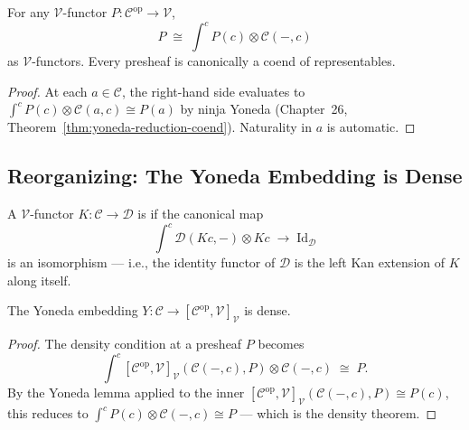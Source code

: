 \begin{theorem}
\label{thm:density-formal}
For any $\mathcal{V}$-functor $P : \mathcal{C}^{\mathrm{op}} \to \mathcal{V}$,
\begin{equation*}
  P \;\cong\; \int^c P(c) \otimes \mathcal{C}(-, c)
\end{equation*}
as $\mathcal{V}$-functors. Every presheaf is canonically a coend of
representables.
\end{theorem}

\begin{proof}
At each $a \in \mathcal{C}$, the right-hand side evaluates to
$\int^c P(c) \otimes \mathcal{C}(a, c) \cong P(a)$ by ninja Yoneda
(Chapter~26, Theorem~\ref{thm:yoneda-reduction-coend}). Naturality in $a$ is
automatic.
\end{proof}

\subsection{Reorganizing: The Yoneda Embedding is Dense}

\begin{definition}
\label{def:dense}
A $\mathcal{V}$-functor $K : \mathcal{C} \to \mathcal{D}$ is  if
the canonical map
\begin{equation*}
  \int^c \mathcal{D}(K c, -) \otimes K c \;\longrightarrow\; \mathrm{Id}_\mathcal{D}
\end{equation*}
is an isomorphism — i.e., the identity functor of $\mathcal{D}$ is the left
Kan extension of $K$ along itself.
\end{definition}

\begin{corollary}
\label{cor:yoneda-dense}
The Yoneda embedding $Y : \mathcal{C} \to [\mathcal{C}^{\mathrm{op}},
\mathcal{V}]_\mathcal{V}$ is dense.
\end{corollary}

\begin{proof}
The density condition at a presheaf $P$ becomes
\begin{equation*}
  \int^c [\mathcal{C}^{\mathrm{op}}, \mathcal{V}]_\mathcal{V}(\mathcal{C}(-, c), P)
  \otimes \mathcal{C}(-, c) \;\cong\; P.
\end{equation*}
By the Yoneda lemma applied to the inner $[\mathcal{C}^{\mathrm{op}},
\mathcal{V}]_\mathcal{V}(\mathcal{C}(-, c), P) \cong P(c)$, this reduces to
$\int^c P(c) \otimes \mathcal{C}(-, c) \cong P$ — which is the density
theorem.
\end{proof}


